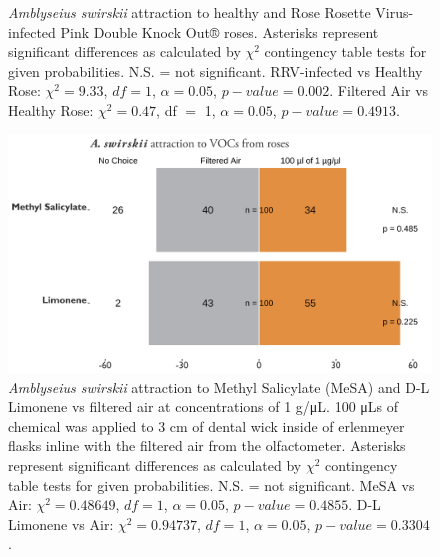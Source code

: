 \documentclass[12pt,final,CPage]{ufthesis}
\begin{document}
{\begin{figure}
{  }

  \caption[\textit{Amblyseius swirskii} attraction to healthy and Rose Rosette Virus-infected Pink Double Knock Out® roses]{\textit{Amblyseius swirskii} attraction to healthy and Rose Rosette Virus-infected Pink Double Knock Out® roses. Asterisks represent significant differences as calculated by $\chi^2$ contingency table tests for given probabilities. N.S. = not significant. RRV-infected vs Healthy Rose: $\chi^2 = 9.33$, $df = 1$, $\alpha = 0.05$, $p-value = 0.002$. Filtered Air vs Healthy Rose: $\chi^2 = 0.47$, df $=$ 1, $\alpha = 0.05$, $p-value = 0.4913$.}\label{fig:aswir-rrd}
  \end{figure}
  \begin{figure}

  {\centering \includegraphics[width=1\linewidth]{figure/rrv_graph_olfact_vocs} 

  }

  \caption[\textit{Amblyseius swirskii} attraction to Methyl Salicylate (MeSA) and D-L Limonene vs filtered air]{\textit{Amblyseius swirskii} attraction to Methyl Salicylate (MeSA) and D-L Limonene vs filtered air at concentrations of 1 g/\si{\micro\liter}. 100 \si{\micro\liter}s of chemical was applied to 3 cm of dental wick inside of erlenmeyer flasks inline with the filtered air from the olfactometer. Asterisks represent significant differences as calculated by $\chi^2$ contingency table tests for given probabilities. N.S. = not significant. MeSA vs Air: $\chi^2 = 0.48649$, $df = 1$, $\alpha = 0.05$, $p-value = 0.4855$. D-L Limonene vs Air: $\chi^2 = 0.94737$, $df = 1$, $\alpha = 0.05$, $p-value = 0.3304$.}\label{fig:aswir-mesa-lim}
  \end{figure}
  \begin{figure}


\end{figure}}
\end{document}
